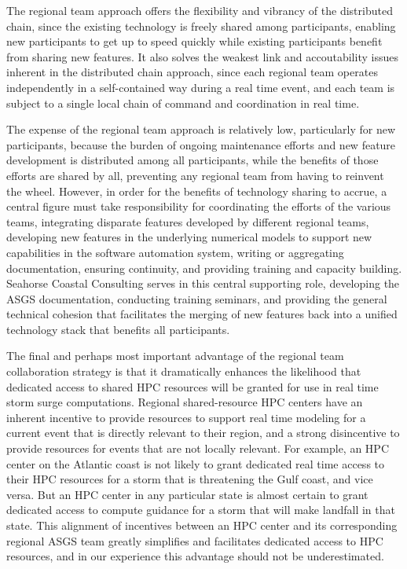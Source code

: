 \documentclass[jmse,article,submit,moreauthors,pdftex,12pt,a4paper]{mdpi}
\begin{document}
The regional team approach offers the flexibility and vibrancy of 
the distributed chain, since the existing technology is freely 
shared among participants, enabling new participants to get up to 
speed quickly while existing participants benefit from sharing new 
features. It also solves the weakest link and accoutability issues 
inherent in the distributed chain approach, since each regional team 
operates independently in a self-contained way during a real time 
event, and each team is subject to a single local chain of command and 
coordination in real time.

The expense of the regional team approach is relatively low, 
particularly for new participants, because the burden of ongoing 
maintenance efforts and new feature development is distributed among 
all participants, while the benefits of those efforts are shared by 
all, preventing any regional team from having to reinvent the wheel. 
However, in order for the benefits of technology sharing to accrue, 
a central figure must take responsibility for coordinating the 
efforts of the various teams, integrating disparate features 
developed by different regional teams, developing new features in 
the underlying numerical models to support new capabilities in the 
software automation system, writing or aggregating documentation, 
ensuring continuity, and providing training and capacity building. 
Seahorse Coastal Consulting serves in this central supporting role, 
developing the ASGS documentation, conducting training seminars, and 
providing the general technical cohesion that facilitates the 
merging of new features back into a unified technology stack that 
benefits all participants. 

The final and perhaps most important advantage of the regional team 
collaboration strategy is that it dramatically enhances the 
likelihood that dedicated access to shared HPC resources will be 
granted for use in real time storm surge computations. Regional 
shared-resource HPC centers have an inherent incentive to provide 
resources to support real time modeling for a current event that is 
directly relevant to their region, and a strong disincentive to 
provide resources for events that are not locally relevant. For 
example, an HPC center on the Atlantic coast is not likely to grant 
dedicated real time access to their HPC resources for a storm that 
is threatening the Gulf coast, and vice versa. But an HPC center in 
any particular state is almost certain to grant dedicated access to 
compute guidance for a storm that will make landfall in that state. 
This alignment of incentives between an HPC center and its 
corresponding regional ASGS team greatly simplifies and facilitates 
dedicated access to HPC resources, and in our experience this 
advantage should not be underestimated. 
\end{document}
